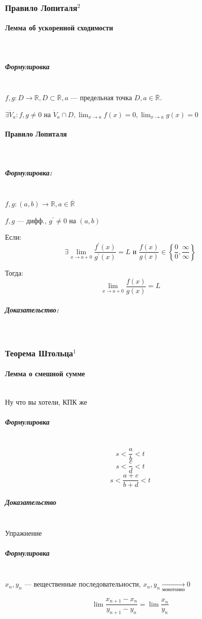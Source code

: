 \documentclass{article}
\let\vanillaparagraph\paragraph
\let\vanillasubparagraph\subparagraph
\renewcommand{\paragraph}[1]{\vanillaparagraph{#1}\mbox{}\\}
\renewcommand{\subparagraph}[1]{\vanillasubparagraph{#1}\mbox{}\\}
\begin{document}
\subsubsection{Правило Лопиталя\texorpdfstring{$^2$}{}}

\paragraph{Лемма об ускоренной сходимости}
\subparagraph{Формулировка}

$f, g: D \rightarrow \mathbb{R}, D \subset \overline{\mathbb{R}}, a$ --- предельная точка $D, a \in \overline{\mathbb{R}}$.

$\exists \dot{V}_a : f, g \neq 0$ на $\dot{V}_a \cap D, \lim_{x \rightarrow a}{f(x)} = 0, \lim_{x \rightarrow a}{g(x)} = 0$

\paragraph{Правило Лопиталя}
\subparagraph{Формулировка:}

$f, g: (a, b) \rightarrow \mathbb{R}, a \in \overline{\mathbb{R}}$

$f, g$ --- дифф., $g^\prime \neq 0$ на $(a, b)$

Если:
\[\exists \lim_{x \rightarrow a + 0}{\frac{f^\prime(x)}{g^\prime(x)}} = L \text{ и } \frac{f(x)}{g(x)} \in \left\{\frac{0}{0}, \frac{\infty}{\infty}\right\}\]

Тогда: 
\[\lim_{x \rightarrow a + 0}{\frac{f(x)}{g(x)}} = L\]

\subparagraph{Доказательство:}



\subsubsection{Теорема Штольца\texorpdfstring{$^1$}{}}
\paragraph{Лемма о смешной сумме}
Ну что вы хотели, КПК же
\subparagraph{Формулировка}
$$
s < \frac ab< t
$$
$$
s < \frac c d < t
$$
$$
s < \frac {a+c}{b+d} < t
$$
\subparagraph{Доказательство}
Упражнение \Smiley

\subparagraph{Формулировка}
$x_n, y_n$ --- вещественные последовательности, $x_n, y_n \underset{\text{монотонно}}{\rightarrow} 0$

$$
\lim \frac{x_{n+1} - x_{n}}{y_{n+1} - y_n} = \lim \frac{x_n}{y_n}
$$
\end{document}
